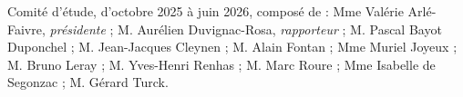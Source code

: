 Comité d'étude, d'octobre 2025 à juin 2026, composé de : Mme Valérie Arlé-Faivre, \textit{présidente} ; M. Aurélien Duvignac-Rosa, \textit{rapporteur} ; M. Pascal Bayot Duponchel ; M. Jean-Jacques Cleynen ; M. Alain Fontan ; Mme Muriel Joyeux ; M. Bruno Leray ; M. Yves-Henri Renhas ; M. Marc Roure ; Mme Isabelle de Segonzac ; M. Gérard Turck.